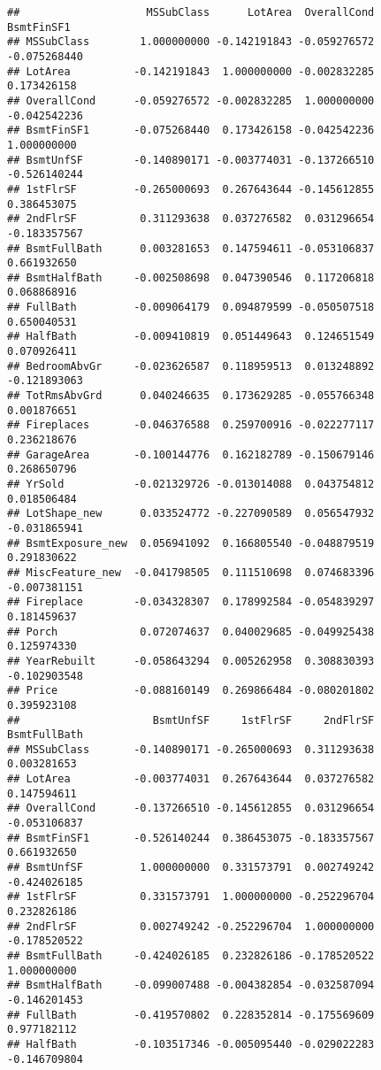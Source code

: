 \documentclass[]{article}
\begin{document}
\begin{verbatim}
##                    MSSubClass      LotArea  OverallCond   BsmtFinSF1
## MSSubClass        1.000000000 -0.142191843 -0.059276572 -0.075268440
## LotArea          -0.142191843  1.000000000 -0.002832285  0.173426158
## OverallCond      -0.059276572 -0.002832285  1.000000000 -0.042542236
## BsmtFinSF1       -0.075268440  0.173426158 -0.042542236  1.000000000
## BsmtUnfSF        -0.140890171 -0.003774031 -0.137266510 -0.526140244
## 1stFlrSF         -0.265000693  0.267643644 -0.145612855  0.386453075
## 2ndFlrSF          0.311293638  0.037276582  0.031296654 -0.183357567
## BsmtFullBath      0.003281653  0.147594611 -0.053106837  0.661932650
## BsmtHalfBath     -0.002508698  0.047390546  0.117206818  0.068868916
## FullBath         -0.009064179  0.094879599 -0.050507518  0.650040531
## HalfBath         -0.009410819  0.051449643  0.124651549  0.070926411
## BedroomAbvGr     -0.023626587  0.118959513  0.013248892 -0.121893063
## TotRmsAbvGrd      0.040246635  0.173629285 -0.055766348  0.001876651
## Fireplaces       -0.046376588  0.259700916 -0.022277117  0.236218676
## GarageArea       -0.100144776  0.162182789 -0.150679146  0.268650796
## YrSold           -0.021329726 -0.013014088  0.043754812  0.018506484
## LotShape_new      0.033524772 -0.227090589  0.056547932 -0.031865941
## BsmtExposure_new  0.056941092  0.166805540 -0.048879519  0.291830622
## MiscFeature_new  -0.041798505  0.111510698  0.074683396 -0.007381151
## Fireplace        -0.034328307  0.178992584 -0.054839297  0.181459637
## Porch             0.072074637  0.040029685 -0.049925438  0.125974330
## YearRebuilt      -0.058643294  0.005262958  0.308830393 -0.102903548
## Price            -0.088160149  0.269866484 -0.080201802  0.395923108
##                     BsmtUnfSF     1stFlrSF     2ndFlrSF BsmtFullBath
## MSSubClass       -0.140890171 -0.265000693  0.311293638  0.003281653
## LotArea          -0.003774031  0.267643644  0.037276582  0.147594611
## OverallCond      -0.137266510 -0.145612855  0.031296654 -0.053106837
## BsmtFinSF1       -0.526140244  0.386453075 -0.183357567  0.661932650
## BsmtUnfSF         1.000000000  0.331573791  0.002749242 -0.424026185
## 1stFlrSF          0.331573791  1.000000000 -0.252296704  0.232826186
## 2ndFlrSF          0.002749242 -0.252296704  1.000000000 -0.178520522
## BsmtFullBath     -0.424026185  0.232826186 -0.178520522  1.000000000
## BsmtHalfBath     -0.099007488 -0.004382854 -0.032587094 -0.146201453
## FullBath         -0.419570802  0.228352814 -0.175569609  0.977182112
## HalfBath         -0.103517346 -0.005095440 -0.029022283 -0.146709804

\end{verbatim}
\end{document}
